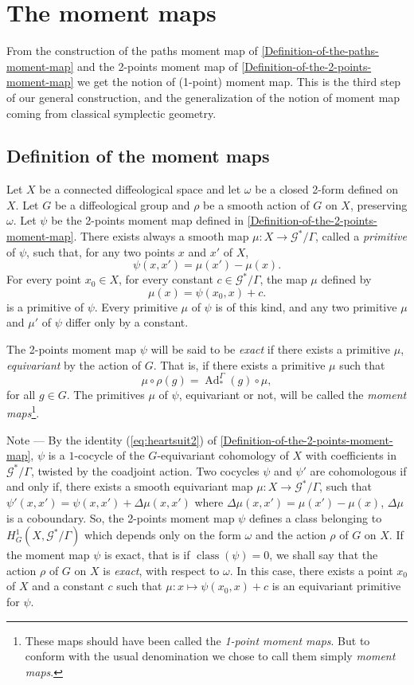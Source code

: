 \documentclass[10pt,reqno,twoside]{amsart}
\newcommand{\cG}{\mathcal{G}}
\DeclareMathOperator{\Ad}{Ad}
\DeclareMathOperator{\class}{class}
\theoremstyle{plain}
\theoremstyle{definition}
\newcommand{\article}[1]{\subsection{#1}}
\begin{document}
  \section{The moment maps}
  
  From the construction of the paths moment map of \ref{Definition-of-the-paths-moment-map} and the 2-points moment map of \ref{Definition-of-the-2-points-moment-map} we get the notion of (1-point) moment map.
  This is the third step of our general construction,
  and the generalization of the notion of moment map coming from classical symplectic geometry.
  
  \article{Definition of the moment maps}
  \label{Definition-of-the-moment-maps}
  Let $X$ be a connected diffeological space and let $\omega$ be a closed 2-form defined on $X$.
  Let $G$ be a diffeological group and $\rho$ be a smooth action of $G$ on $X$,
  preserving $\omega$.
  Let $\psi$ be the 2-points moment map defined in \ref{Definition-of-the-2-points-moment-map}.
  There exists always a smooth map $\mu : X \to \cG^*\!/\Gamma$,
  called a {\em primitive} of $\psi$,
  such that,
  for any two points $x$ and $x'$ of $X$,
  $$
    \psi(x,x') = \mu(x') - \mu(x).
    $$
  For every point $x_0 \in X$,
  for every constant $c \in \cG^*\!/\Gamma$,
  the map $\mu$ defined by
  $$
    \mu(x) = \psi(x_0,x) + c.
    $$
  is a primitive of $\psi$.
  Every primitive $\mu$ of $\psi$ is of this kind,
  and any two primitive $\mu$ and $\mu'$ of $\psi$ differ only by a constant.
  
  The 2-points moment map $\psi$ will be said to be {\em exact} if there exists a primitive $\mu$,
  {\em equivariant} by the action of $G$.
  That is,
  if there exists a primitive $\mu$ such that
  $$
    \mu \circ \rho(g) = \Ad_*^\Gamma(g) \circ \mu,
    $$
  for all $g \in G$.
  The primitives $\mu$ of $\psi$,
  equivariant or not,
  will be called the {\em moment maps}\footnote{These maps should have been called the {\em 1-point moment maps\/}. But to conform with the usual denomination we chose to call them simply {\em moment maps}.}.
  
  {\sc Note} --- By the identity (\ref{eq:heartsuit2}) of \ref{Definition-of-the-2-points-moment-map},
  $\psi$ is a $1$-cocycle of the $G$-equivariant cohomology of $X$ with coefficients in $\cG^*\!/\Gamma$,
  twisted by the coadjoint action.
  Two cocycles $\psi$ and $\psi'$ are cohomologous if and only if,
  there exists a smooth equivariant map $\mu : X \to \cG^*\!/\Gamma$,
  such that $\psi'(x,x') = \psi(x,x') + \Delta \mu(x,x')$ where $\Delta \mu(x,x') = \mu(x') - \mu(x)$,
  $\Delta \mu$ is a coboundary.
  So,
  the 2-points moment map $\psi$ defines a class belonging to $H^1_G(X,\cG^*\!/\Gamma)$ which depends only on the form $\omega$ and the action $\rho$ of $G$ on $X$.
  If the moment map $\psi$ is exact,
  that is if $\class(\psi) = 0$,
  we shall say that the action $\rho$ of $G$ on $X$ is {\em exact},
  with respect to $\omega$.
  In this case,
  there exists a point $x_0$ of $X$ and a constant $c$ such that $\mu : x \mapsto \psi(x_0,x) + c$ is an equivariant primitive for $\psi$.
  
\end{document}
